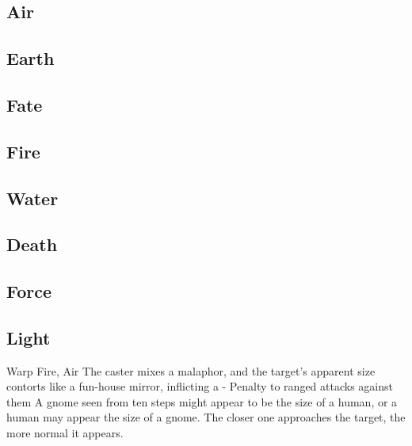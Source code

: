 \begin{multicols}{2}

\subsection{Air}



\subsection{Earth}



\subsection{Fate}


\subsection{Fire}


\subsection{Water}


\subsection{Death}
\label{Death1}


\subsection{Force}


\null
\subsection{Light}

  {}%
  {Warp}%
  {Fire, Air}%
  {}%
  {The caster mixes a malaphor, and the target's apparent size contorts like a fun-house mirror, inflicting a - Penalty to ranged attacks against them}%
  {A gnome seen from ten steps might appear to be the size of a human, or a human may appear the size of a gnome.
    The closer one approaches the target, the more normal it appears.}


\end{multicols}
